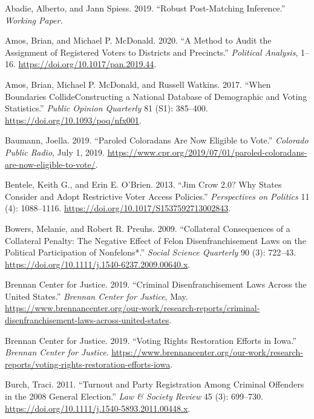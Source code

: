 \documentclass[
  12pt,
]{article}
\newlength{\cslhangindent}
\newenvironment{cslreferences}%
  {\setlength{\parindent}{0pt}%
  \everypar{\setlength{\hangindent}{\cslhangindent}}\ignorespaces}%
  {\par}
\begin{document}
\hypertarget{refs}{}
\begin{cslreferences}
\leavevmode\hypertarget{ref-Abadie2019}{}%
Abadie, Alberto, and Jann Spiess. 2019. ``Robust Post-Matching Inference.'' \emph{Working Paper.}

\leavevmode\hypertarget{ref-Amos2020}{}%
Amos, Brian, and Michael P. McDonald. 2020. ``A Method to Audit the Assignment of Registered Voters to Districts and Precincts.'' \emph{Political Analysis}, 1--16. \url{https://doi.org/10.1017/pan.2019.44}.

\leavevmode\hypertarget{ref-Amos2017}{}%
Amos, Brian, Michael P. McDonald, and Russell Watkins. 2017. ``When Boundaries CollideConstructing a National Database of Demographic and Voting Statistics.'' \emph{Public Opinion Quarterly} 81 (S1): 385--400. \url{https://doi.org/10.1093/poq/nfx001}.

\leavevmode\hypertarget{ref-Baumann2019}{}%
Baumann, Joella. 2019. ``Paroled Coloradans Are Now Eligible to Vote.'' \emph{Colorado Public Radio}, July 1, 2019. \url{https://www.cpr.org/2019/07/01/paroled-coloradans-are-now-eligible-to-vote/}.

\leavevmode\hypertarget{ref-Bentele2013}{}%
Bentele, Keith G., and Erin E. O'Brien. 2013. ``Jim Crow 2.0? Why States Consider and Adopt Restrictive Voter Access Policies.'' \emph{Perspectives on Politics} 11 (4): 1088--1116. \url{https://doi.org/10.1017/S1537592713002843}.

\leavevmode\hypertarget{ref-Bowers2009}{}%
Bowers, Melanie, and Robert R. Preuhs. 2009. ``Collateral Consequences of a Collateral Penalty: The Negative Effect of Felon Disenfranchisement Laws on the Political Participation of Nonfelons*.'' \emph{Social Science Quarterly} 90 (3): 722--43. \url{https://doi.org/10.1111/j.1540-6237.2009.00640.x}.

\leavevmode\hypertarget{ref-bcj_laws}{}%
Brennan Center for Justice. 2019. ``Criminal Disenfranchisement Laws Across the United States.'' \emph{Brennan Center for Justice}, May. \url{https://www.brennancenter.org/our-work/research-reports/criminal-disenfranchisement-laws-across-united-states}.

\leavevmode\hypertarget{ref-bcj_laws}{}%
Brennan Center for Justice. 2019. ``Voting Rights Restoration Efforts in Iowa.'' \emph{Brennan Center for Justice}. \url{https://www.brennancenter.org/our-work/research-reports/voting-rights-restoration-efforts-iowa}.

\leavevmode\hypertarget{ref-Burch2011}{}%
Burch, Traci. 2011. ``Turnout and Party Registration Among Criminal Offenders in the 2008 General Election.'' \emph{Law \& Society Review} 45 (3): 699--730. \url{https://doi.org/10.1111/j.1540-5893.2011.00448.x}.


\end{cslreferences}
\end{document}
